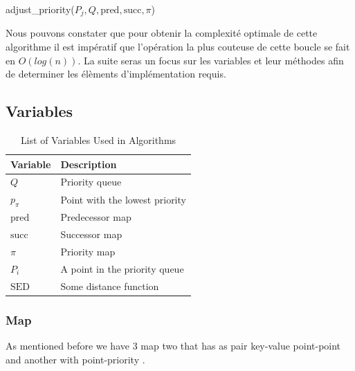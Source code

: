 \documentclass[twoside,12pt, a4paper]{report}
\begin{document}
\begin{algorithm}[H]
	\DontPrintSemicolon
	
	
	\caption{adjust\_priority($P_j, Q, \text{pred}, \text{succ}, \pi$)}
	\label{alg:adjust_priority}
\end{algorithm}


Nous pouvons constater que pour obtenir la complexité optimale de cette algorithme il est impératif que l'opération la plus couteuse de cette boucle se fait en $O(log(n))$. La suite seras un focus sur les variables et leur méthodes afin de determiner les élèments d'implémentation requis. 

\subsection{Variables}


\begin{table}[h!]
	\centering
	\caption{List of Variables Used in Algorithms}
	\label{tab:variables}
	\begin{tabular}{ll}
		\hline
		\textbf{Variable} & \textbf{Description} \\
		\hline
		$Q$             & Priority queue \\
		$p_{\pi}$       & Point with the lowest priority \\
		$\text{pred}$   & Predecessor map \\
		$\text{succ}$   & Successor map \\
		$\pi$           & Priority map \\
		$P_i$           & A point in the priority queue \\
		$\text{SED}$    & Some distance function \\
		\hline
	\end{tabular}
\end{table}

\subsubsection{Map}

As mentioned before we have 3 map two that has as pair key-value point-point and another with point-priority . 
\end{document}
